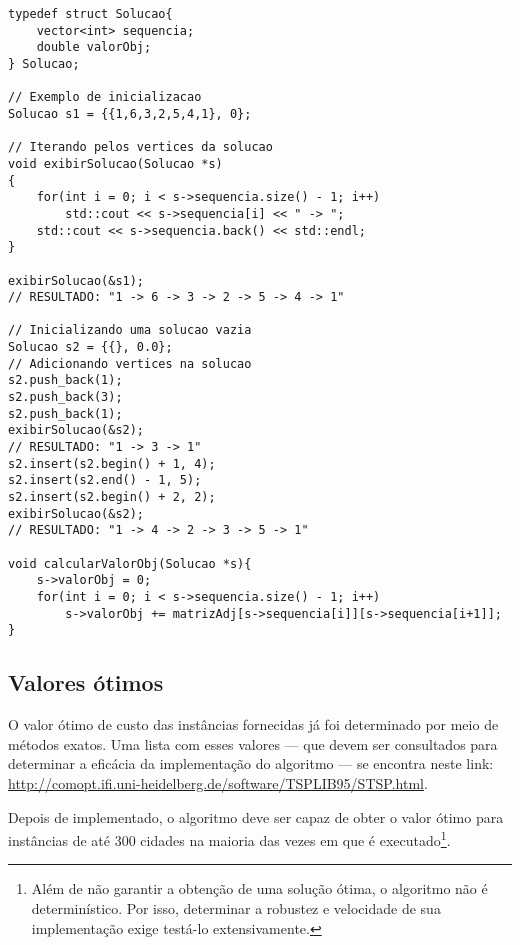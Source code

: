 \begin{lstlisting}[style=cplusplusListStyle] 
typedef struct Solucao{
    vector<int> sequencia;
    double valorObj;
} Solucao;

// Exemplo de inicializacao 
Solucao s1 = {{1,6,3,2,5,4,1}, 0};

// Iterando pelos vertices da solucao 
void exibirSolucao(Solucao *s)
{
    for(int i = 0; i < s->sequencia.size() - 1; i++)
        std::cout << s->sequencia[i] << " -> ";
    std::cout << s->sequencia.back() << std::endl;
}

exibirSolucao(&s1);
// RESULTADO: "1 -> 6 -> 3 -> 2 -> 5 -> 4 -> 1" 

// Inicializando uma solucao vazia 
Solucao s2 = {{}, 0.0};
// Adicionando vertices na solucao 
s2.push_back(1);
s2.push_back(3);
s2.push_back(1);
exibirSolucao(&s2);
// RESULTADO: "1 -> 3 -> 1"
s2.insert(s2.begin() + 1, 4);
s2.insert(s2.end() - 1, 5);
s2.insert(s2.begin() + 2, 2);
exibirSolucao(&s2);
// RESULTADO: "1 -> 4 -> 2 -> 3 -> 5 -> 1"

void calcularValorObj(Solucao *s){
    s->valorObj = 0;
    for(int i = 0; i < s->sequencia.size() - 1; i++)
        s->valorObj += matrizAdj[s->sequencia[i]][s->sequencia[i+1]];
}
\end{lstlisting}


\subsection{Valores ótimos}
O valor ótimo de custo das instâncias fornecidas já foi determinado por meio de métodos exatos. Uma lista com esses valores --- que devem ser consultados para determinar a eficácia da implementação do algoritmo --- se encontra neste link: \url{http://comopt.ifi.uni-heidelberg.de/software/TSPLIB95/STSP.html}.

Depois de implementado, o algoritmo deve ser capaz de obter o valor ótimo para instâncias de até 300 cidades na maioria das vezes em que é executado\footnote{Além de não garantir a obtenção de uma solução ótima, o algoritmo não é determinístico. Por isso, determinar a robustez e velocidade de sua implementação exige testá-lo extensivamente.}.
